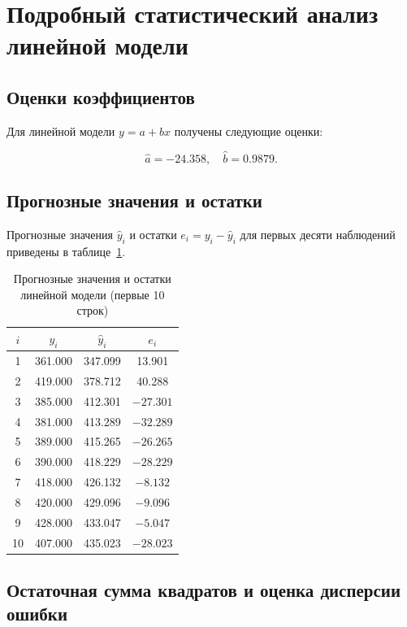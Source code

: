 \section{Подробный статистический анализ линейной модели}

\subsection{Оценки коэффициентов}

Для линейной модели \(y = a + bx\) получены следующие оценки:

\[
\hat{a} = -24.358, \quad \hat{b} = 0.9879.
\]

\subsection{Прогнозные значения и остатки}

Прогнозные значения \(\hat{y}_i\) и остатки \(e_i = y_i - \hat{y}_i\) для первых десяти наблюдений приведены в таблице~\ref{tab:residuals}.

\begin{table}[H]
\centering
\caption{Прогнозные значения и остатки линейной модели (первые 10 строк)}
\label{tab:residuals}
\begin{tabular}{cccc}
\toprule
\(i\) & \(y_i\) & \(\hat{y}_i\) & \(e_i\) \\
\midrule
1 & 361.000 & 347.099 & 13.901 \\
2 & 419.000 & 378.712 & 40.288 \\
3 & 385.000 & 412.301 & \(-27.301\) \\
4 & 381.000 & 413.289 & \(-32.289\) \\
5 & 389.000 & 415.265 & \(-26.265\) \\
6 & 390.000 & 418.229 & \(-28.229\) \\
7 & 418.000 & 426.132 & \(-8.132\) \\
8 & 420.000 & 429.096 & \(-9.096\) \\
9 & 428.000 & 433.047 & \(-5.047\) \\
10 & 407.000 & 435.023 & \(-28.023\) \\
\bottomrule
\end{tabular}
\end{table}

\subsection{Остаточная сумма квадратов и оценка дисперсии ошибки}

